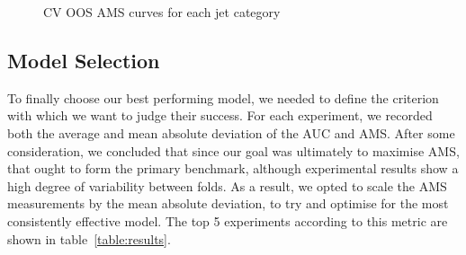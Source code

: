 \begin{figure}[htbp]
    \begin{adjustbox}{max width=1.4\linewidth,center}
    \centering
     \hspace*{-0.9em}
     \hspace*{-0.9em}
    \end{adjustbox}
    \caption{CV OOS AMS curves for each jet category}
    \label{fig:ams_curve}
\end{figure}


\subsection{Model Selection}
To finally choose our best performing model, we needed to define the criterion with which we want to judge their success. For each experiment, we recorded both the average and mean absolute deviation of the AUC and AMS. After some consideration, we concluded that since our goal was ultimately to maximise AMS, that ought to form the primary benchmark, although experimental results show a high degree of variability between folds. As a result, we opted to scale the AMS measurements by the mean absolute deviation, to try and optimise for the most consistently effective model. The top 5 experiments according to this metric are shown in table~\ref{table:results}.

